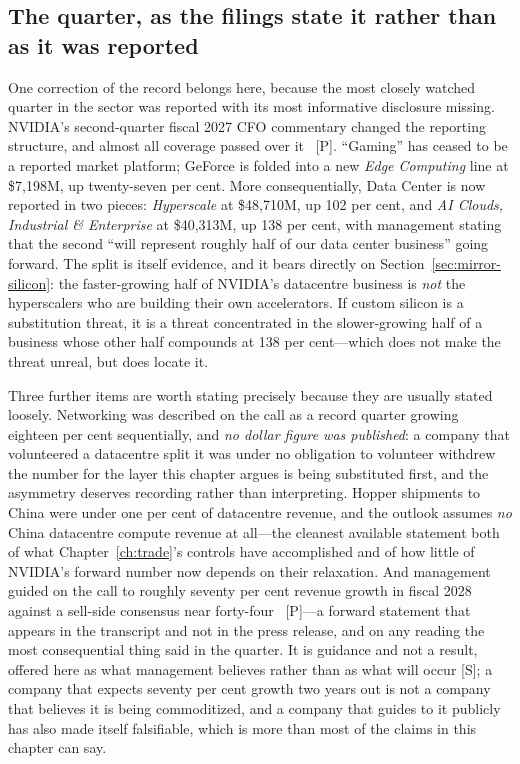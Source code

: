 \subsection{The quarter, as the filings state it rather than as it was reported}

One correction of the record belongs here, because the most closely watched quarter in the sector was reported with its most informative disclosure missing. NVIDIA's second-quarter fiscal 2027 CFO commentary changed the reporting structure, and almost all coverage passed over it~\cite{nvda-segments} [P]. ``Gaming'' has ceased to be a reported market platform; GeForce is folded into a new \emph{Edge Computing} line at \$7{,}198M, up twenty-seven per cent. More consequentially, Data Center is now reported in two pieces: \emph{Hyperscale} at \$48{,}710M, up 102 per cent, and \emph{AI Clouds, Industrial \& Enterprise} at \$40{,}313M, up 138 per cent, with management stating that the second ``will represent roughly half of our data center business'' going forward. The split is itself evidence, and it bears directly on Section~\ref{sec:mirror-silicon}: the faster-growing half of NVIDIA's datacentre business is \emph{not} the hyperscalers who are building their own accelerators. If custom silicon is a substitution threat, it is a threat concentrated in the slower-growing half of a business whose other half compounds at 138 per cent---which does not make the threat unreal, but does locate it.

Three further items are worth stating precisely because they are usually stated loosely. Networking was described on the call as a record quarter growing eighteen per cent sequentially, and \emph{no dollar figure was published}: a company that volunteered a datacentre split it was under no obligation to volunteer withdrew the number for the layer this chapter argues is being substituted first, and the asymmetry deserves recording rather than interpreting. Hopper shipments to China were under one per cent of datacentre revenue, and the outlook assumes \emph{no} China datacentre compute revenue at all---the cleanest available statement both of what Chapter~\ref{ch:trade}'s controls have accomplished and of how little of NVIDIA's forward number now depends on their relaxation. And management guided on the call to roughly seventy per cent revenue growth in fiscal 2028 against a sell-side consensus near forty-four~\cite{nvda-segments} [P]---a forward statement that appears in the transcript and not in the press release, and on any reading the most consequential thing said in the quarter. It is guidance and not a result, offered here as what management believes rather than as what will occur [S]; a company that expects seventy per cent growth two years out is not a company that believes it is being commoditized, and a company that guides to it publicly has also made itself falsifiable, which is more than most of the claims in this chapter can say.

